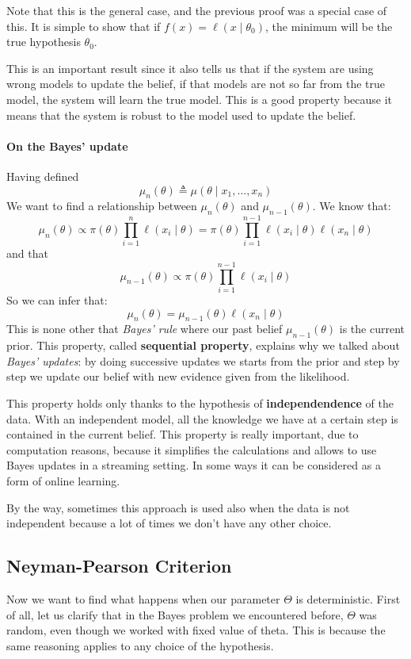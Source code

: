 Note that this is the general case, and the previous proof was a special case of this. It is simple to show that if $f(x) = \ell(x \mid \theta_0)$, the minimum will be the true hypothesis $\theta_0$.

This is an important result since it also tells us that if the system are using wrong models to update the belief, if that models are not so far from the true model, the system will learn the true model. This is a good property because it means that the system is robust to the model used to update the belief.

\paragraph*{On the Bayes' update}
Having defined
\[
    \mu_n(\theta) \triangleq \mu(\theta \mid x_1, \dots, x_n)
\]
We want to find a relationship between $\mu_n(\theta)$ and $\mu_{n-1}(\theta)$.
We know that:
\[
    \mu_n(\theta) \propto \pi(\theta) \prod_{i=1}^n \ell(x_i \mid \theta) = \pi(\theta) \prod_{i=1}^{n-1} \ell(x_i \mid \theta) \ell(x_n \mid \theta)
\]
and that
\[
    \mu_{n-1}(\theta) \propto \pi(\theta) \prod_{i=1}^{n-1} \ell(x_i \mid \theta)
\]
So we can infer that:
\[
    \mu_n(\theta) = \mu_{n-1}(\theta) \ell(x_n \mid \theta)
\]
This is none other that \textit{Bayes' rule} where our past belief $\mu_{n-1}(\theta)$ is the current prior. This property, called \textbf{sequential property}, explains why we talked about \textit{Bayes' updates}: by doing successive updates we starts from the prior and step by step we update our belief with new evidence given from the likelihood.

This property holds only thanks to the hypothesis of \textbf{independendence} of the data. With an independent model, all the knowledge we have at a certain step is contained in the current belief. This property is really important, due to computation reasons, because it simplifies the calculations and allows to use Bayes updates in a streaming setting. In some ways it can be considered as a form of online learning.

By the way, sometimes this approach is used also when the data is not independent because a lot of times we don't have any other choice.
\subsection{Neyman-Pearson Criterion}
Now we want to find what happens when our parameter $\Theta$ is deterministic. First of all, let us clarify that in the Bayes problem we encountered before, $\Theta$ was random, even though we worked with fixed value of theta. This is because the same reasoning applies to any choice of the hypothesis.

